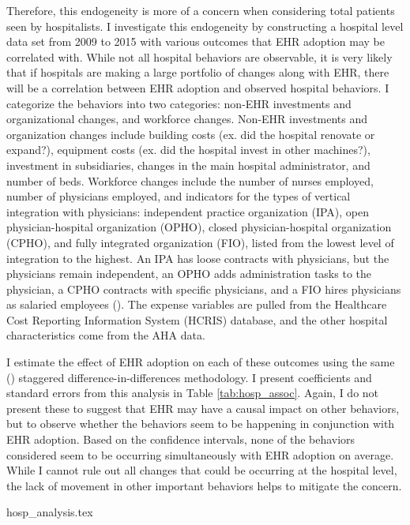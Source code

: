 \documentclass[12pt]{article}
\begin{document}
Therefore, this endogeneity is more of a concern when considering total patients seen by hospitalists. I investigate this endogeneity by constructing a hospital level data set from 2009 to 2015 with various outcomes that EHR adoption may be correlated with. While not all hospital behaviors are observable, it is very likely that if hospitals are making a large portfolio of changes along with EHR, there will be a correlation between EHR adoption and observed hospital behaviors. I categorize the behaviors into two categories: non-EHR investments and organizational changes, and workforce changes. Non-EHR investments and organization changes include building costs (ex. did the hospital renovate or expand?), equipment costs (ex. did the hospital invest in other machines?), investment in subsidiaries, changes in the main hospital administrator, and number of beds. Workforce changes include the number of nurses employed, number of physicians employed, and indicators for the types of vertical integration with physicians: independent practice organization (IPA), open physician-hospital organization (OPHO), closed physician-hospital organization (CPHO), and fully integrated organization (FIO), listed from the lowest level of integration to the highest. An IPA has loose contracts with physicians, but the physicians remain independent, an OPHO adds administration tasks to the physician, a CPHO contracts with specific physicians, and a FIO hires physicians as salaried employees (\cite{short2017integration}). The expense variables are pulled from the Healthcare Cost Reporting Information System (HCRIS) database, and the other hospital characteristics come from the AHA data.

I estimate the effect of EHR adoption on each of these outcomes using the same \citeauthor{callaway2021difference} (\citeyear{callaway2021difference}) staggered difference-in-differences methodology. I present coefficients and standard errors from this analysis in Table \ref{tab:hosp_assoc}. Again, I do not present these to suggest that EHR may have a causal impact on other behaviors, but to observe whether the behaviors seem to be happening in conjunction with EHR adoption. Based on the confidence intervals, none of the behaviors considered seem to be occurring simultaneously with EHR adoption on average. While I cannot rule out all changes that could be occurring at the hospital level, the lack of movement in other important behaviors helps to mitigate the concern.

{hosp_analysis.tex}
\end{document}
